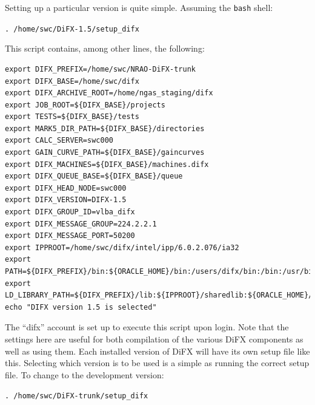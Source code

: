 Setting up a particular version is quite simple.
Assuming the {\tt bash} shell:

{\tt . /home/swc/DiFX-1.5/setup\_difx}

This script contains, among other lines, the following:

\begin{verbatim}
export DIFX_PREFIX=/home/swc/NRAO-DiFX-trunk
export DIFX_BASE=/home/swc/difx
export DIFX_ARCHIVE_ROOT=/home/ngas_staging/difx
export JOB_ROOT=${DIFX_BASE}/projects
export TESTS=${DIFX_BASE}/tests
export MARK5_DIR_PATH=${DIFX_BASE}/directories
export CALC_SERVER=swc000
export GAIN_CURVE_PATH=${DIFX_BASE}/gaincurves
export DIFX_MACHINES=${DIFX_BASE}/machines.difx
export DIFX_QUEUE_BASE=${DIFX_BASE}/queue
export DIFX_HEAD_NODE=swc000
export DIFX_VERSION=DIFX-1.5
export DIFX_GROUP_ID=vlba_difx
export DIFX_MESSAGE_GROUP=224.2.2.1
export DIFX_MESSAGE_PORT=50200
export IPPROOT=/home/swc/difx/intel/ipp/6.0.2.076/ia32
export PATH=${DIFX_PREFIX}/bin:${ORACLE_HOME}/bin:/users/difx/bin:/bin:/usr/bin
export LD_LIBRARY_PATH=${DIFX_PREFIX}/lib:${IPPROOT}/sharedlib:${ORACLE_HOME}/lib
echo "DIFX version 1.5 is selected"
\end{verbatim}

The ``difx'' account is set up to execute this script upon login.
Note that the settings here are useful for both compilation of the various DiFX components as well as using them.
Each installed version of DiFX will have its own setup file like this.
Selecting which version is to be used is a simple as running the correct setup file.
To change to the development version:

{\tt . /home/swc/DiFX-trunk/setup\_difx}

